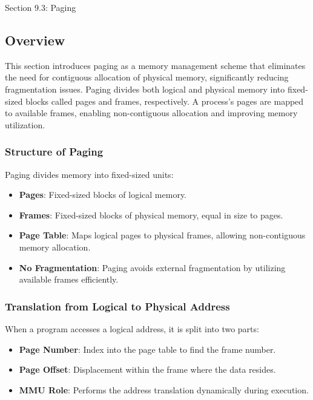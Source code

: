 \begin{notes}{Section 9.3: Paging}
    \subsection*{Overview}

    This section introduces paging as a memory management scheme that eliminates the need for contiguous allocation of physical memory, significantly reducing fragmentation issues. Paging divides both 
    logical and physical memory into fixed-sized blocks called pages and frames, respectively. A process’s pages are mapped to available frames, enabling non-contiguous allocation and improving memory 
    utilization.
    
    \subsubsection*{Structure of Paging}
    
    Paging divides memory into fixed-sized units:
    \begin{itemize}
        \item \textbf{Pages}: Fixed-sized blocks of logical memory.
        \item \textbf{Frames}: Fixed-sized blocks of physical memory, equal in size to pages.
        \item \textbf{Page Table}: Maps logical pages to physical frames, allowing non-contiguous memory allocation.
        \item \textbf{No Fragmentation}: Paging avoids external fragmentation by utilizing available frames efficiently.
    \end{itemize}
    
    \subsubsection*{Translation from Logical to Physical Address}
    
    When a program accesses a logical address, it is split into two parts:
    \begin{itemize}
        \item \textbf{Page Number}: Index into the page table to find the frame number.
        \item \textbf{Page Offset}: Displacement within the frame where the data resides.
        \item \textbf{MMU Role}: Performs the address translation dynamically during execution.
    \end{itemize}
    

\end{notes}
